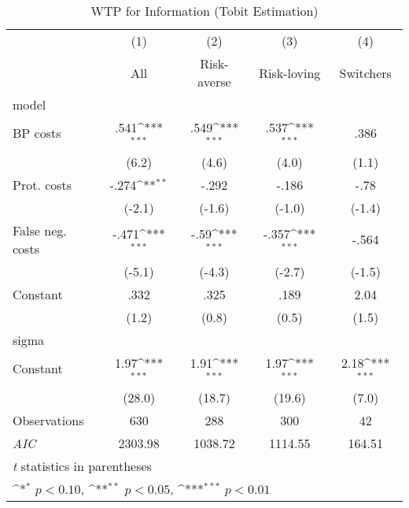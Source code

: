 \begin{table}[htbp]\centering
\def\sym#1{\ifmmode^{#1}\else\(^{#1}\)\fi}
\caption{WTP for Information (Tobit Estimation)}
\begin{tabular}{l*{4}{c}}
\hline\hline
                &\multicolumn{1}{c}{(1)}&\multicolumn{1}{c}{(2)}&\multicolumn{1}{c}{(3)}&\multicolumn{1}{c}{(4)}\\
                &\multicolumn{1}{c}{All}&\multicolumn{1}{c}{Risk-averse}&\multicolumn{1}{c}{Risk-loving}&\multicolumn{1}{c}{Switchers}\\
\hline
model           &                  &                  &                  &                  \\
BP costs        &     .541\sym{***}&     .549\sym{***}&     .537\sym{***}&     .386         \\
                &    (6.2)         &    (4.6)         &    (4.0)         &    (1.1)         \\
Prot. costs     &    -.274\sym{**} &    -.292         &    -.186         &     -.78         \\
                &   (-2.1)         &   (-1.6)         &   (-1.0)         &   (-1.4)         \\
False neg. costs&    -.471\sym{***}&     -.59\sym{***}&    -.357\sym{***}&    -.564         \\
                &   (-5.1)         &   (-4.3)         &   (-2.7)         &   (-1.5)         \\
Constant        &     .332         &     .325         &     .189         &     2.04         \\
                &    (1.2)         &    (0.8)         &    (0.5)         &    (1.5)         \\
\hline
sigma           &                  &                  &                  &                  \\
Constant        &     1.97\sym{***}&     1.91\sym{***}&     1.97\sym{***}&     2.18\sym{***}\\
                &   (28.0)         &   (18.7)         &   (19.6)         &    (7.0)         \\
\hline
Observations    &      630         &      288         &      300         &       42         \\
\textit{AIC}    &  2303.98         &  1038.72         &  1114.55         &   164.51         \\
\hline\hline
\multicolumn{5}{l}{\footnotesize \textit{t} statistics in parentheses}\\
\multicolumn{5}{l}{\footnotesize \sym{*} \(p<0.10\), \sym{**} \(p<0.05\), \sym{***} \(p<0.01\)}\\
\end{tabular}
\end{table}

